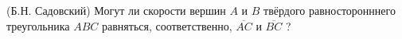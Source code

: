 (Б.Н. Садовский)
Могут ли скорости вершин $A$ и $B$ твёрдого равносторонннего
треугольника $ABC$ равняться, соответственно, $\overline{AC}$ и
$\overline{BC}$ ?
